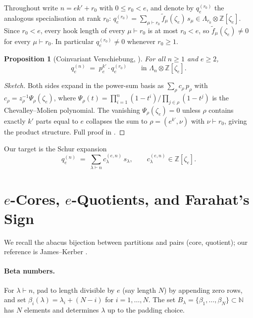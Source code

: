 \documentclass[11pt]{article}
\newtheorem{proposition}[theorem]{Proposition}
\theoremstyle{definition}
\theoremstyle{remark}
\newcommand{\ftilde}{\widetilde{f}}
\newcommand{\qen}{q_e^{(n)}}
\newcommand{\qer}{q_e^{(r_0)}}
\newcommand{\zetae}{\zeta_e}
\newcommand{\ZZ}{\mathbb{Z}}
\newcommand{\NN}{\mathbb{N}}
\newcommand{\Lam}{\Lambda}
\begin{document}
Throughout write $n=ek'+r_0$ with $0\le r_0<e$, and denote by $\qer$ the
analogous specialisation at rank $r_0$:
$\qer=\sum_{\mu\vdash r_0}\ftilde_\mu(\zetae)\,s_\mu\in\Lam_{r_0}\otimes\ZZ[\zetae]$.
Since $r_0<e$, every hook length of every $\mu\vdash r_0$ is at most $r_0<e$,
so $\ftilde_\mu(\zetae)\ne 0$ for every $\mu\vdash r_0$. In particular
$\qer\ne 0$ whenever $r_0\ge 1$.

\begin{proposition}[Coinvariant Verschiebung, \cite{Cli26a}]
\label{prop:factor}
For all $n\ge 1$ and $e\ge 2$,
\[
  \qen \;=\; p_e^{k'}\cdot \qer\qquad\text{in }\Lam_n\otimes\ZZ[\zetae].
\]
\end{proposition}

\begin{proof}[Sketch]
Both sides expand in the power-sum basis as $\sum_\rho c_\rho\,p_\rho$ with
$c_\rho=z_\rho^{-1}\Psi_\rho(\zetae)$, where
$\Psi_\rho(t)=\prod_{i=1}^n(1-t^i)/\prod_{j\in\rho}(1-t^j)$ is the
Chevalley--Molien polynomial. The vanishing $\Psi_\rho(\zetae)=0$ unless
$\rho$ contains exactly $k'$ parts equal to $e$ collapses the sum to
$\rho=(e^{k'},\nu)$ with $\nu\vdash r_0$, giving the product structure.
Full proof in \cite{Cli26a}.
\end{proof}

Our target is the Schur expansion
\begin{equation}
\label{eq:target-expansion}
  \qen \;=\; \sum_{\lambda\vdash n} c_\lambda^{(e,n)}\,s_\lambda,
  \qquad c_\lambda^{(e,n)}\in\ZZ[\zetae].
\end{equation}

\section{$e$-Cores, $e$-Quotients, and Farahat's Sign}
\label{sec:cores}

We recall the abacus bijection between partitions and pairs (core, quotient);
our reference is James--Kerber \cite[\S 2.7]{JK81}.

\paragraph{Beta numbers.}
For $\lambda\vdash n$, pad to length divisible by $e$ (say length $N$) by
appending zero rows, and set
$\beta_i(\lambda)=\lambda_i+(N-i)$ for $i=1,\ldots,N$. The set
$B_\lambda=\{\beta_1,\ldots,\beta_N\}\subset\NN$ has $N$ elements and
determines $\lambda$ up to the padding choice.
\end{document}
